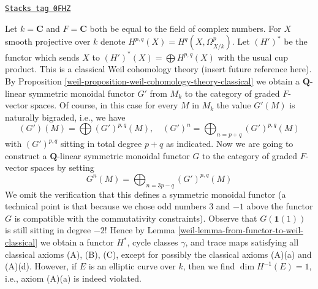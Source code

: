\begin{example}
\label{weil-example-weird-weil}
\href{https://stacks.math.columbia.edu/tag/0FHZ}{\texttt{Stacks tag 0FHZ}}

Let $k = \mathbf{C}$ and $F = \mathbf{C}$ both be equal to the field
of complex numbers. For $X$ smooth projective over $k$ denote
$H^{p, q}(X) = H^q(X, \Omega^p_{X/k})$. Let $(H')^*$ be the functor
which sends $X$ to $(H')^*(X) = \bigoplus H^{p, q}(X)$ with the
usual cup product.
This is a classical Weil cohomology theory (insert future reference here).
By Proposition \ref{weil-proposition-weil-cohomology-theory-classical}
we obtain a $\mathbf{Q}$-linear symmetric monoidal functor $G'$ from $M_k$
to the category of graded $F$-vector spaces. Of course, in this case
for every $M$ in $M_k$ the value $G'(M)$ is naturally bigraded, i.e.,
we have
$$
(G')(M) = \bigoplus (G')^{p, q}(M),\quad
(G')^n = \bigoplus\nolimits_{n = p + q} (G')^{p, q}(M)
$$
with $(G')^{p, q}$ sitting in total degree $p + q$ as indicated.
Now we are going to construct a $\mathbf{Q}$-linear symmetric monoidal functor
$G$ to the category of graded $F$-vector spaces by setting
$$
G^n(M) = \bigoplus\nolimits_{n = 3p - q} (G')^{p, q}(M)
$$
We omit the verification that this defines a symmetric monoidal
functor (a technical point is that because we chose odd numbers
$3$ and $-1$ above the functor $G$ is compatible with the
commutativity constraints).
Observe that $G(\mathbf{1}(1))$ is still sitting in degree $-2$!
Hence by Lemma \ref{weil-lemma-from-functor-to-weil-classical}
we obtain a functor $H^*$, cycle classes $\gamma$, and trace maps
satisfying all classical axioms (A), (B), (C), except for possibly
the classical axioms (A)(a) and (A)(d).
However, if $E$ is an elliptic curve over $k$, then we find
$\dim H^{-1}(E) = 1$, i.e., axiom (A)(a) is indeed violated.
\end{example}

